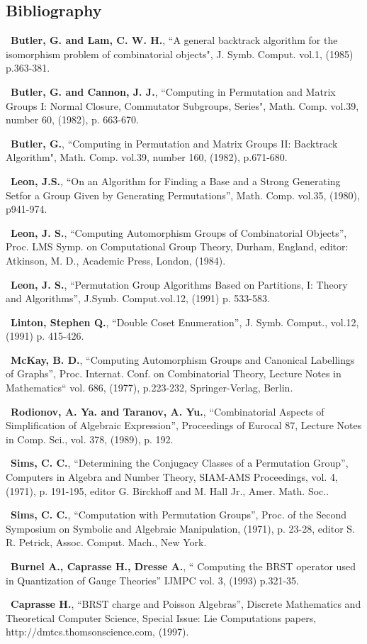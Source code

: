 \subsection{Bibliography}
\begin{list}{-}{\parsep 0in \itemsep 1pt}     
\item\  {\bf Butler, G. and Lam, C. W. H.},
   ``A general backtrack algorithm for the isomorphism problem of
     combinatorial objects",
 J. Symb. Comput. vol.1, (1985) p.363-381.
\item\ {\bf Butler, G. and Cannon, J. J.},
    ``Computing in Permutation and Matrix Groups {I}: Normal Closure,
        Commutator Subgroups, Series",
 Math. Comp. vol.39, number 60, (1982), p. 663-670.
\item\ {\bf Butler, G.},
     ``Computing in Permutation and Matrix Groups {II}:
       Backtrack Algorithm",  Math. Comp. vol.39, number 160,
      (1982), p.671-680.
\item\  {\bf Leon, J.S.},
 ``On an Algorithm for Finding a Base and a Strong 
Generating Setfor a Group Given by Generating Permutations'',
Math. Comp. vol.35, (1980), p941-974.
\item\  {\bf Leon, J. S.},
 ``Computing Automorphism Groups of Combinatorial Objects'',
 Proc. {LMS} Symp. on Computational Group Theory, Durham,
                  England, editor: Atkinson, M. D.,
 Academic Press, London, (1984). 
\item\  {\bf Leon, J. S.},
``Permutation Group Algorithms Based on Partitions, {I}: Theory and
          Algorithms'', J.Symb. Comput.vol.12, (1991) p. 533-583.
\item\  {\bf Linton, Stephen Q.}, ``Double Coset Enumeration'',
        J. Symb. Comput., vol.12, (1991) p. 415-426.
\item\ {\bf McKay, B. D.},
``Computing Automorphism Groups and Canonical Labellings of Graphs'',
Proc. Internat. Conf. on Combinatorial Theory,
Lecture Notes in Mathematics`` vol. 686, (1977), p.223-232,
Springer-Verlag, Berlin.
\item\ {\bf Rodionov, A. Ya. and Taranov, A. Yu.},
``Combinatorial Aspects of Simplification of
Algebraic Expression'', Proceedings of Eurocal 87,
Lecture Notes in Comp. Sci., vol. 378,  (1989), p. 192.
\item\ {\bf Sims, C. C.},
``Determining the Conjugacy Classes of a Permutation Group'',
Computers in Algebra and Number Theory,
SIAM-AMS Proceedings, vol. 4, (1971), p. 191-195,
editor G. Birckhoff and M. {Hall Jr.}, Amer. Math. Soc..
\item\ {\bf Sims, C. C.},
``Computation with Permutation Groups'',
Proc. of the Second Symposium on Symbolic and Algebraic
                          Manipulation, (1971), p. 23-28,
editor S. R. Petrick, Assoc. Comput. Mach., New York.
\item\ {\bf   Burnel A., Caprasse H., Dresse A.},
`` Computing the BRST operator used in Quantization of Gauge Theories''
IJMPC vol. 3, (1993) p.321-35.
\item\ {\bf Caprasse H.},
``BRST charge and Poisson Algebras'',
Discrete Mathematics and Theoretical Computer Science,
Special Issue: Lie Computations papers, http://dmtcs.thomsonscience.com,
(1997).
\end{list}
